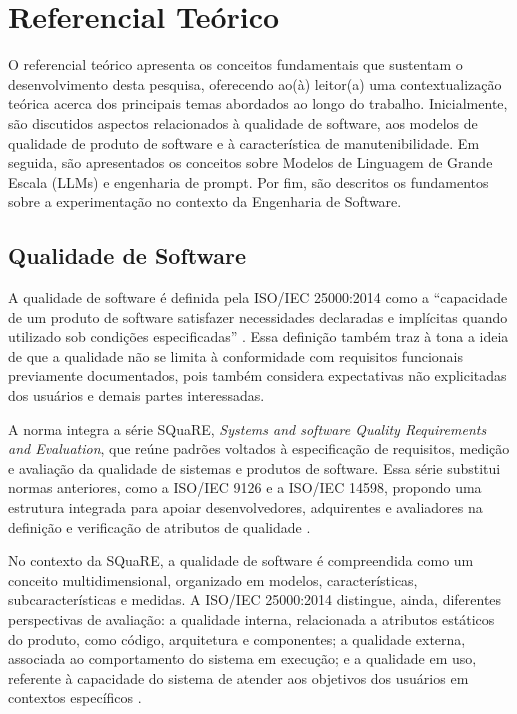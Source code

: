 \chapter[Referencial Teórico]{Referencial Teórico}
\label{cap:referencial_teorico}

O referencial teórico apresenta os conceitos fundamentais que sustentam o desenvolvimento desta pesquisa, oferecendo ao(à) leitor(a) uma contextualização teórica acerca dos principais temas abordados ao longo do trabalho. Inicialmente, são discutidos aspectos relacionados à qualidade de software, aos modelos de qualidade de produto de software e à característica de manutenibilidade. Em seguida, são apresentados os conceitos sobre Modelos de Linguagem de Grande Escala (LLMs) e engenharia de prompt. Por fim, são descritos os fundamentos sobre a experimentação no contexto da Engenharia de Software.

\section{Qualidade de Software}

A qualidade de software é definida pela ISO/IEC 25000:2014 como a ``capacidade de um produto de software satisfazer necessidades declaradas e implícitas quando utilizado sob condições especificadas'' . Essa definição também traz à tona a ideia de que a qualidade não se limita à conformidade com requisitos funcionais previamente documentados, pois também considera expectativas não explicitadas dos usuários e demais partes interessadas.

A norma integra a série SQuaRE, \textit{Systems and software Quality Requirements and Evaluation}, que reúne padrões voltados à especificação de requisitos, medição e avaliação da qualidade de sistemas e produtos de software. Essa série substitui normas anteriores, como a ISO/IEC 9126 e a ISO/IEC 14598, propondo uma estrutura integrada para apoiar desenvolvedores, adquirentes e avaliadores na definição e verificação de atributos de qualidade \cite{isoiec25000}.

No contexto da SQuaRE, a qualidade de software é compreendida como um conceito multidimensional, organizado em modelos, características, subcaracterísticas e medidas. A ISO/IEC 25000:2014 distingue, ainda, diferentes perspectivas de avaliação: a qualidade interna, relacionada a atributos estáticos do produto, como código, arquitetura e componentes; a qualidade externa, associada ao comportamento do sistema em execução; e a qualidade em uso, referente à capacidade do sistema de atender aos objetivos dos usuários em contextos específicos \cite{isoiec25000}.

